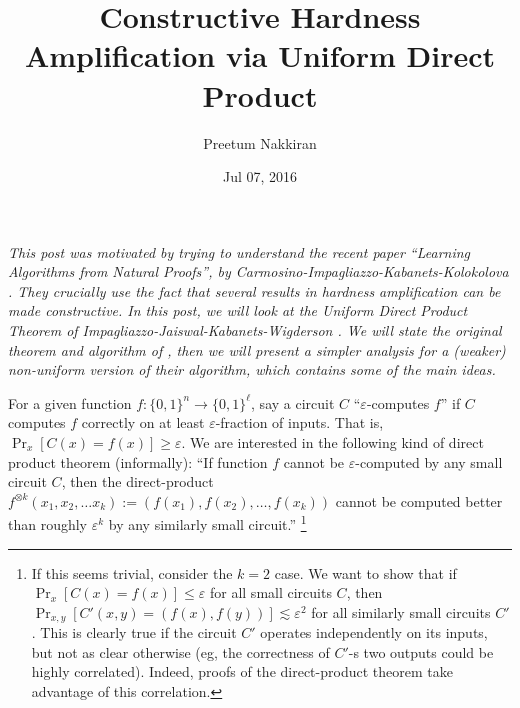 \documentclass[]{article}
\title{Constructive Hardness Amplification via Uniform Direct Product}
\author{Preetum Nakkiran}
\date{Jul 07, 2016}
\newcommand{\1}{\mathbb{1}}
\renewcommand{\epsilon}{\varepsilon}
\newcommand{\eps}{\epsilon}
\newcommand{\ox}{\otimes}
\begin{document}
\maketitle



\emph{This post was motivated by trying to understand the recent paper
``Learning Algorithms from Natural Proofs'', by
Carmosino-Impagliazzo-Kabanets-Kolokolova \cite{learning}.
They crucially use the fact that several results in hardness amplification can
be made constructive.
In this post, we will look at the Uniform Direct Product Theorem
of Impagliazzo-Jaiswal-Kabanets-Wigderson \cite{IJKW}.
We will state the original theorem and algorithm of \cite{IJKW},
then we will present a simpler analysis for a
(weaker) non-uniform version of their algorithm,
which contains some of the main ideas.
}


For a given function $f: \{0, 1\}^n \to \{0, 1\}^\ell$, say a circuit $C$ ``$\eps$-computes $f$''
if $C$ computes $f$ correctly on at least $\eps$-fraction of inputs.
That is, $\Pr_x[C(x) = f(x)] \geq \epsilon$.
We are interested in the following kind of direct product theorem
(informally):
``If function $f$ cannot be $\eps$-computed by any small circuit $C$,
then the direct-product $f^{\ox k}(x_1, x_2, \dots x_k) := (f(x_1), f(x_2), \dots, f(x_k))$
cannot be computed better than roughly $\eps^k$ by any similarly small
circuit.''
\footnote{
    If this seems trivial, consider the $k=2$ case.
    We want to show that if $\Pr_x[C(x) = f(x)]  \leq \epsilon$ for all small
    circuits $C$, then $\Pr_{x, y}[C'(x, y) = (f(x), f(y))] \lesssim
\eps^2$ for all similarly small circuits $C'$.
This is clearly true if the circuit $C'$ operates independently on its inputs,
but not as clear otherwise (eg, the correctness of $C'$-s two outputs could be
highly correlated). Indeed, proofs of the direct-product theorem take advantage
of this correlation.
}
\end{document}
